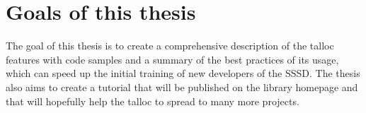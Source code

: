 \section{Goals of this thesis}

The goal of this thesis is to create a comprehensive description of the talloc
features with code samples and a summary of the best practices of its usage,
which can speed up the initial training of new developers of the SSSD. The
thesis also aims to create a tutorial that will be published on the library
homepage and that will hopefully help the talloc to spread to many more projects.
